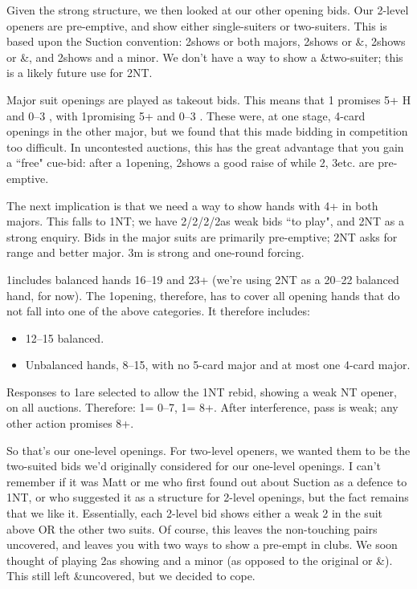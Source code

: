 \documentclass[a4paper,14pt]{extarticle}
\begin{document}
Given the strong \clubs structure, we then looked at our other opening
bids.  Our 2-level openers are pre-emptive, and show either single-suiters or
two-suiters.  This is based upon the Suction convention: 2\clubs shows
\diamonds or both majors, 2\diamonds shows \hearts or
\spades\&\clubs, 2\hearts shows \spades or
\clubs\&\diamonds, and 2\spades shows \hearts and a minor.
We don't have a way to show a \spades\&\diamonds two-suiter; this is
a likely future use for 2NT.

Major suit openings are played as takeout bids.  This means that 1\spades
promises 5+ H and 0--3 \spades, with 1\hearts promising 5+
\spades and 0--3 \hearts.  These were, at one stage, 4-card openings
in the other major, but we found that this made bidding in competition too
difficult.  In uncontested auctions, this has the great advantage that you gain
a ``free" cue-bid: after a 1\spades opening, 2\spades shows a good
raise of \hearts while 2\hearts, 3\hearts etc. are pre-emptive.

The next implication is that we need a way to show hands with 4+ in both
majors.  This falls to 1NT; we have
2\clubs/2\diamonds/2\hearts/2\spades as weak bids ``to
play", and 2NT as a strong enquiry.  Bids in the major suits are primarily
pre-emptive; 2NT asks for range and better major.  3m is strong and one-round
forcing.

1\clubs includes balanced hands 16--19 and 23+ (we're using 2NT as a
20--22 balanced hand, for now).  The 1\diamonds opening, therefore, has to
cover all opening hands that do not fall into one of the above categories.  It
therefore includes:

\begin{itemize}
\item 12--15 balanced.
\item Unbalanced hands, 8--15, with no 5-card major and at most one 4-card
      major.
\end{itemize}

Responses to 1\diamonds are selected to allow the 1NT rebid, showing a
weak NT opener, on all auctions.  Therefore: 1\hearts = 0--7,
1\spades = 8+.  After interference, pass is weak; any other action
promises 8+.

So that's our one-level openings.  For two-level openers, we wanted them to be
the two-suited bids we'd originally considered for our one-level openings.  I
can't remember if it was Matt or me who first found out about Suction as a
defence to 1NT, or who suggested it as a structure for 2-level openings, but
the fact remains that we like it.  Essentially, each 2-level bid shows either a
weak 2 in the suit above OR the other two suits.  Of course, this leaves the
non-touching pairs uncovered, and leaves you with two ways to show a pre-empt
in clubs.  We soon thought of playing 2\spades as showing \hearts and
a minor (as opposed to the original \clubs or
		\hearts\&\diamonds).  This still left
\spades\&\diamonds uncovered, but we decided to cope.
\end{document}
